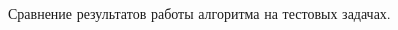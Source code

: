 \begin{frame}
\begin{columns}[t]
\begin{column}{0.48\linewidth}
\begin{figure}
\begin{subfigure}{\linewidth}
          \label{cw_gen_plot}
        \end{subfigure}
      \caption{Сравнение результатов работы алгоритма на тестовых задачах.}
    \end{figure}
\end{column}
\end{columns}
\end{frame}